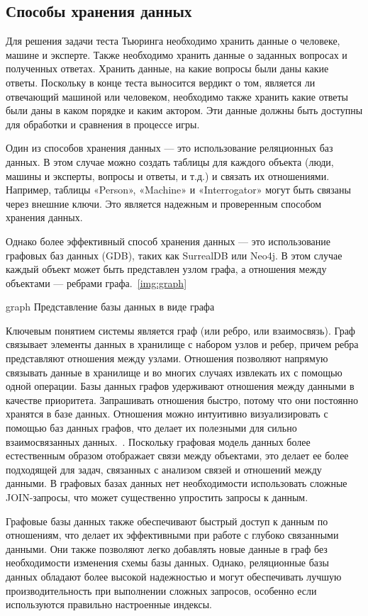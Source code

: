 \subsection{Способы хранения данных}

Для решения задачи теста Тьюринга необходимо хранить данные о человеке, машине и эксперте. Также необходимо хранить данные о заданных вопросах и полученных ответах. Хранить данные, на какие вопросы были даны какие ответы. Поскольку в конце теста выносится вердикт о том, является ли отвечающий машиной или человеком, необходимо также хранить какие ответы были даны в каком порядке и каким актором. Эти данные должны быть доступны для обработки и сравнения в процессе игры.

Один из способов хранения данных --- это использование реляционных баз данных. В этом случае можно создать таблицы для каждого объекта (люди, машины и эксперты, вопросы и ответы, и т.д.) и связать их отношениями. Например, таблицы «Person», «Machine» и «Interrogator» могут быть связаны через внешние ключи. Это является надежным и проверенным способом хранения данных.

Однако более эффективный способ хранения данных --- это использование графовых баз данных (GDB), таких как SurrealDB или Neo4j. В этом случае каждый объект может быть представлен узлом графа, а отношения между объектами --- ребрами графа.~\ref{img:graph}

\img{100mm}
{graph}
{Представление базы данных в виде графа}

Ключевым понятием системы является граф (или ребро, или взаимосвязь). Граф связывает элементы данных в хранилище с набором узлов и ребер, причем ребра представляют отношения между узлами. Отношения позволяют напрямую связывать данные в хранилище и во многих случаях извлекать их с помощью одной операции. Базы данных графов удерживают отношения между данными в качестве приоритета. Запрашивать отношения быстро, потому что они постоянно хранятся в базе данных. Отношения можно интуитивно визуализировать с помощью баз данных графов, что делает их полезными для сильно взаимосвязанных данных.~\cite{graph-exp}.
Поскольку графовая модель данных более естественным образом отображает связи между объектами, это делает ее более подходящей для задач, связанных с анализом связей и отношений между данными. В графовых базах данных нет необходимости использовать сложные JOIN-запросы, что может существенно упростить запросы к данным.

Графовые базы данных также обеспечивают быстрый доступ к данным по отношениям, что делает их эффективными при работе с глубоко связанными данными. Они также позволяют легко добавлять новые данные в граф без необходимости изменения схемы базы данных.
Однако, реляционные базы данных обладают более высокой надежностью и могут обеспечивать лучшую производительность при выполнении сложных запросов, особенно если используются правильно настроенные индексы.

